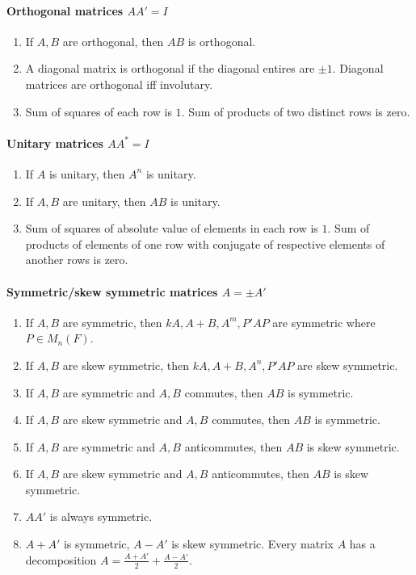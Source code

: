 \paragraph{Orthogonal matrices $AA'=I$}
\begin{enumerate}
	\item If $A,B$ are orthogonal, then $AB$ is orthogonal.
	\item A diagonal matrix is orthogonal if the diagonal entires are $\pm 1$.
		\subitem Diagonal matrices are orthogonal iff involutary.
	\item Sum of squares of each row is $1$. Sum of products of two distinct rows is zero.
\end{enumerate}

\paragraph{Unitary matrices $AA^\ast=I$}
\begin{enumerate}
	\item If $A$ is unitary, then $A^n$ is unitary.
	\item If $A,B$ are unitary, then $AB$ is unitary.
	\item Sum of squares of absolute value of elements in each row is $1$. Sum of products of elements of one row with conjugate of respective elements of another rows is zero.
\end{enumerate}

\paragraph{Symmetric/skew symmetric matrices $A=\pm A'$}
\begin{enumerate}
	\item If $A,B$ are symmetric, then $kA,A+B,A^m,P'AP$ are symmetric where $P \in M_n(F)$.
	\item If $A,B$ are skew symmetric, then $kA,A+B,A^n,P'AP$ are skew symmetric.
	\item If $A,B$ are symmetric and $A,B$ commutes, then $AB$ is symmetric.
	\item If $A,B$ are skew symmetric and $A,B$ commutes, then $AB$ is symmetric.
	\item If $A,B$ are symmetric and $A,B$ anticommutes, then $AB$ is skew symmetric.
	\item If $A,B$ are skew symmetric and $A,B$ anticommutes, then $AB$ is skew symmetric.
	\item $AA'$ is always symmetric.
	\item $A+A'$ is symmetric, $A-A'$ is skew symmetric.
		\subitem Every matrix $A$ has a decomposition $A = \frac{A+A'}{2} + \frac{A-A'}{2}$.
\end{enumerate}

